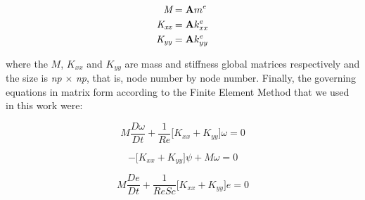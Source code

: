 \begin{align}
  \textit{M} & = \textbf{A} m^{e}\\
  \textit{K\textsubscript{xx}} & = \textbf{A} k_{xx}^{e} \\
  \textit{K\textsubscript{yy}} & = \textbf{A} k_{yy}^{e}
\end{align}


\medskip
\noindent
where the
$M$,
$K_{xx}$ and
$K_{yy}$
are mass and stiffness global matrices respectively and
the size is \textit{np} $\times$ \textit{np}, that is,
node number by node number. 
Finally, the governing equations in matrix form according to 
the Finite Element Method that we used in this work were:


\begin{equation}
 M \frac{D \omega}{Dt} 
 + \frac{1}{\textit{Re}} \Big[ K_{xx} + K_{yy} \Big] \omega
 = 0 \label{vorticity matrix}
\end{equation}

\begin{equation}
 - \Big[ K_{xx} + K_{yy} \Big] \psi + M \omega = 0
\end{equation}

\begin{equation}
 M \frac{De}{Dt} 
 + \frac{1}{\textit{ReSc}} \Big[ K_{xx} + K_{yy} \Big] e
 = 0 \label{concentration matrix}
\end{equation}


